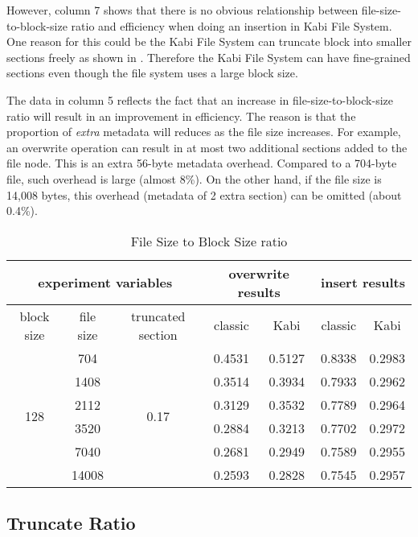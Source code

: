     However, column 7 shows that there is no obvious relationship between file-size-to-block-size ratio and efficiency when doing an insertion in Kabi File System. One reason for this could be the Kabi File System can truncate block into smaller sections freely as shown in . Therefore the Kabi File System can have fine-grained sections even though the file system uses a large block size.
    
    The data in column 5 reflects the fact that an increase in file-size-to-block-size ratio will result in an improvement in efficiency. The reason is that the proportion of \emph{extra} metadata will reduces as the file size increases. For example, an overwrite operation can result in at most two additional sections added to the file node. This is an extra 56-byte metadata overhead. Compared to a 704-byte file, such overhead is large (almost 8\%). On the other hand, if the file size is 14,008 bytes, this overhead (metadata of 2 extra section) can be omitted (about 0.4\%).

\begin{table}[t]
\label{tab:fb_ratio}
\begin{center}
\begin{tabular}{|c|c|c|cccc|}
\hline
\multicolumn{3}{|c|}{experiment variables} & \multicolumn{2}{c|}{overwrite results} & \multicolumn{2}{c|}{insert results}\\
\hline
block size & file size & truncated section & \multicolumn{1}{c|}{classic} & \multicolumn{1}{c|}{Kabi} & \multicolumn{1}{c|}{classic} & Kabi\\
\hline
\multirow{6}{*}{128} & 704 & \multirow{6}{*}{0.17} & 0.4531 & 0.5127 & 0.8338 & 0.2983 \\
& 1408 & & 0.3514 & 0.3934 & 0.7933 & 0.2962 \\
& 2112 & & 0.3129 & 0.3532 & 0.7789 & 0.2964 \\
& 3520 & & 0.2884 & 0.3213 & 0.7702 & 0.2972 \\
& 7040 & & 0.2681 & 0.2949 & 0.7589 & 0.2955 \\
& 14008 & & 0.2593 & 0.2828 & 0.7545 & 0.2957 \\
\hline
\end{tabular}
\end{center}
\caption{File Size to Block Size ratio}
\end{table}

\subsection{Truncate Ratio}

